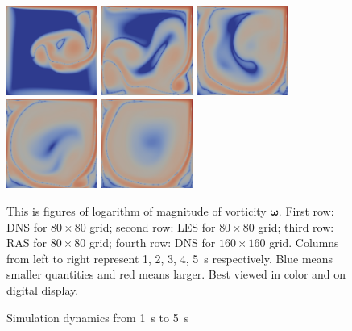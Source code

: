 \documentclass[english, nochinese]{pkupaper}
\begin{document}
\begin{figure}[htbp]
{{
\includegraphics[width=3cm]{Results/Figure02p.pdf}
\includegraphics[width=3cm]{Results/Figure02q.pdf}
\includegraphics[width=3cm]{Results/Figure02r.pdf}
\includegraphics[width=3cm]{Results/Figure02s.pdf}
\includegraphics[width=3cm]{Results/Figure02t.pdf}
}
\caption{Simulation dynamics from \SI{1}{s} to \SI{5}{s}}
\label{Fig:Dy}
}
{
\footnotesize
This is figures of logarithm of magnitude of vorticity $\bm{\omega}$. First row: DNS for $ 80 \times 80 $ grid; second row: LES for $ 80 \times 80 $ grid; third row: RAS for $ 80 \times 80 $ grid; fourth row: DNS for $ 160 \times 160 $ grid. Columns from left to right represent 1, 2, 3, 4, \SI{5}{\second} respectively. Blue means smaller quantities and red means larger. Best viewed in color and on digital display.
}
\end{figure}
\end{document}
